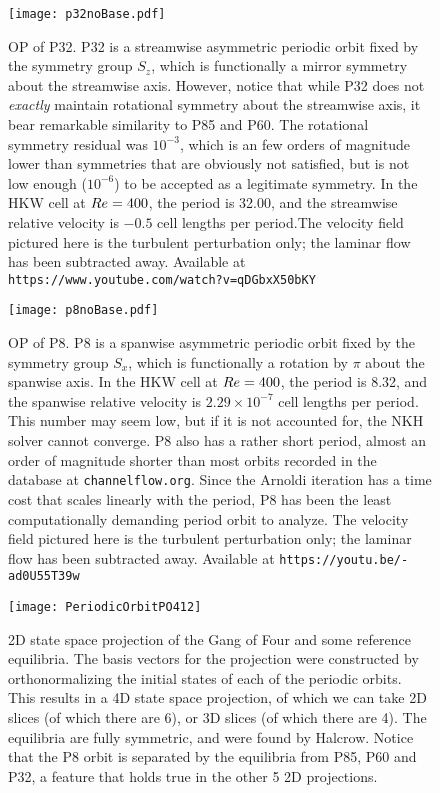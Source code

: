 \begin{figure}
\centerline{\texttt{[image: p32noBase.pdf]}}
\caption{OP of P32. P32 is a streamwise asymmetric periodic orbit fixed by the symmetry group $S_z$, which is functionally a mirror symmetry about the streamwise axis. However, notice that while P32 does not \emph{exactly} maintain rotational symmetry about the streamwise axis, it bear remarkable similarity to P85 and P60. The rotational symmetry residual was $10^{-3}$, which is an few orders of magnitude lower than symmetries that are obviously not satisfied, but is not low enough ($10^{-6}$) to be accepted as a legitimate symmetry.  In the HKW cell at $Re=400$, the period is 32.00, and the streamwise relative velocity is $-0.5$ cell lengths per period.The velocity field pictured here is the turbulent perturbation only; the laminar flow has been subtracted away. Available at {\tt https://www.youtube.com/watch?v=qDGbxX50bKY}}\label{fig:p32}
\end{figure}


\begin{figure}
\centerline{\texttt{[image: p8noBase.pdf]}}
\caption{OP of P8. P8 is a spanwise asymmetric periodic orbit fixed by the symmetry group $S_x$, which is functionally a rotation by $\pi$ about the spanwise axis. In the HKW cell at $Re = 400$, the period is 8.32, and the spanwise relative velocity is $2.29\times 10^{-7}$ cell lengths per period. This number may seem low, but if it is not accounted for, the NKH solver cannot converge. P8 also has a rather short period, almost an order of magnitude shorter than most orbits recorded in the database at {\tt channelflow.org}. Since the Arnoldi iteration has a time cost that scales linearly with the period, P8 has been the least computationally demanding period orbit to analyze. The velocity field pictured here is the turbulent perturbation only; the laminar flow has been subtracted away. Available at {\tt https://youtu.be/-ad0U55T39w}}\label{fig:p8}
\end{figure}



\begin{figure}[h]
\texttt{[image: PeriodicOrbitPO412]}
\caption{2D state space projection of the Gang of Four and some reference equilibria. The basis vectors for the projection were constructed by orthonormalizing the initial states of each of the periodic orbits. This results in a 4D state space projection, of which we can take 2D slices (of which there are 6), or 3D slices (of which there are 4). The equilibria are fully symmetric, and were found by Halcrow. Notice that the P8 orbit is separated by the equilibria from P85, P60 and P32, a feature that holds true in the other 5 2D projections.}\label{fig:POStateSpace}
\end{figure}

